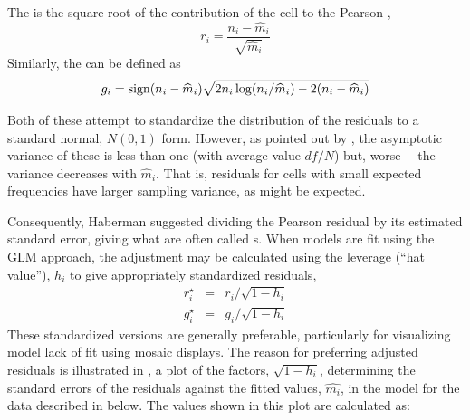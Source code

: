 \documentclass[11pt]{book}\usepackage[]{graphicx}\usepackage[]{color}
\begin{document}
The  is the square root of the contribution of the cell
to the Pearson \chisq,
\begin{equation}\label{eq:reschi2}
r_i = \frac{n_i - \widehat{m}_i}{\sqrt{\widehat{m}_i}}
\end{equation}
Similarly, the  can be defined as
\begin{equation}\label{eq:resdev2}
g_i = \sign({n_i - \widehat{m}_i}) \sqrt{2 n_i \log (n_i / \widehat{m}_i) - 2 (n_i - \widehat{m}_i) }
\end{equation}

Both of these attempt to standardize the distribution of the residuals to a standard normal,
$N (0,1)$ form.  However, as pointed out by \citet{Haberman:73}, the asymptotic variance
of these is less than one (with average value $df/N$)
but, worse--- the variance decreases with $\widehat{m}_i$.
That is, residuals for cells with small expected frequencies have larger sampling variance,
as might be expected.

Consequently, Haberman suggested dividing the Pearson residual by its estimated standard
error, giving what are often called s.
When \loglin models are fit using the GLM approach, the adjustment
may be calculated using the leverage (``hat value''), $h_i$ to give
appropriately standardized residuals,
\begin{eqnarray*}
r_i^\star & = & r_i / \sqrt{1 - h_i} \\
g_i^\star & = & g_i / \sqrt{1 - h_i}
\end{eqnarray*}
These standardized versions are generally preferable, particularly for visualizing
model lack of fit using mosaic displays.
The reason for preferring adjusted residuals is illustrated in
, a plot of the factors, $\sqrt{1 - h_i}$,
determining the standard errors of the residuals against the
fitted values, $\widehat{m_i}$, in the model for the
 data described in  below.
The values shown in this plot are calculated as:
\end{document}
